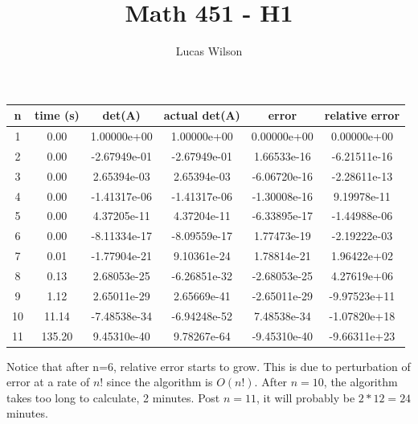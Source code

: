 \documentclass[12pt]{article}
\newenvironment{problem}[2][Problem]{\begin{trivlist}
\item[\hskip \labelsep {\bfseries #1}\hskip \labelsep {\bfseries #2.}]}{\end{trivlist}}
\begin{document}
 
\title{Math 451 - H1}
\author{Lucas Wilson}
\maketitle
 
\begin{problem}{1}
\end{problem}

\begin{tabular}{ c | c | c | c | c | c }
n & time (s) & det(A) & actual det(A) & error & relative error \\
\hline
1 & 0.00 & 1.00000e+00 & 1.00000e+00 & 0.00000e+00 & 0.00000e+00 \\
2 & 0.00 & -2.67949e-01 & -2.67949e-01 & 1.66533e-16 & -6.21511e-16 \\
3 & 0.00 & 2.65394e-03 & 2.65394e-03 & -6.06720e-16 & -2.28611e-13 \\
4 & 0.00 & -1.41317e-06 & -1.41317e-06 & -1.30008e-16 & 9.19978e-11 \\
5 & 0.00 & 4.37205e-11 & 4.37204e-11 & -6.33895e-17 & -1.44988e-06 \\
6 & 0.00 & -8.11334e-17 & -8.09559e-17 & 1.77473e-19 & -2.19222e-03 \\
7 & 0.01 & -1.77904e-21 & 9.10361e-24 & 1.78814e-21 & 1.96422e+02 \\
8 & 0.13 & 2.68053e-25 & -6.26851e-32 & -2.68053e-25 & 4.27619e+06 \\
9 & 1.12 & 2.65011e-29 & 2.65669e-41 & -2.65011e-29 & -9.97523e+11 \\
10 & 11.14 & -7.48538e-34 & -6.94248e-52 & 7.48538e-34 & -1.07820e+18 \\
11 & 135.20 & 9.45310e-40 & 9.78267e-64 & -9.45310e-40 & -9.66311e+23 \\
\end{tabular}
\newline
\newline
Notice that after n=6, relative error starts to grow. This is due to perturbation of error at a rate of $n!$ since the algorithm is $O(n!)$. After $n=10$, the algorithm takes too long to calculate, 2 minutes. Post $n=11$, it will probably be $2*12=24$ minutes.
\\

\begin{problem}{2}
\end{problem}
\end{document}
